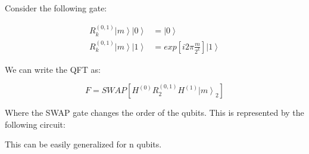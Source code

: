 Consider the following gate:

\begin{equation}
\begin{split}
R_k^{(0,1)} \left| m \right> \left| 0 \right> & =   \left| 0 \right> \\
R_k^{(0,1)} \left| m \right> \left| 1 \right> &  =  exp \left[ i 2 \pi \frac{m}{2^k} \right]   \left| 1 \right> 
\end{split}
\end{equation}

We can write the QFT as: 

\begin{equation}
F = SWAP[H^{(0)} R_2^{(0,1)} H^{(1)} \left| m \right>_2]
\end{equation}

Where the SWAP gate changes the order of the qubits. This is represented by the following circuit:



This can be easily generalized for n qubits.